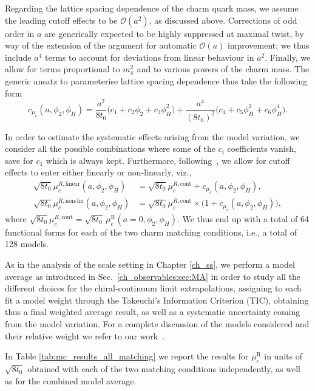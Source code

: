 Regarding the lattice spacing dependence of the charm quark mass, we assume the leading cutoff effects to 
be $\mathcal{O}(a^2)$, as discussed above. Corrections of odd order in $a$ are generically expected to be highly
suppressed at maximal twist, by way of the extension of the argument for automatic $\mathcal{O}(a)$
improvement; we thus include $a^4$ terms to account for deviations from linear behaviour
in $a^2$. Finally, we allow for terms proportional to $m_\pi^2$ and to various powers of the charm
mass. The generic ansatz to parameterise lattice spacing dependence thus take the following form
\begin{equation}
	c_{\mu_c}(a, \phi_2, \phi_H) = \frac{a^2}{8t_0} \big(
	c_1 + c_2\phi_2 + c_3 \phi_H^2
	\big)
	+
	\frac{a^4}{(8t_0)^2}\big(
	c_4 + c_5\phi_H^2 + c_6 \phi_H^4
	\big).
	\label{eq:lattice_spacing_dependence}
\end{equation} 

In order to estimate the systematic effects arising from the model variation, we consider all the possible 
combinations where some of the $c_i$ coefficients vanish, save for $c_1$ which is always kept.
Furthermore, following~\cite{Heitger:2021apz}, we allow for cutoff effects to enter either linearly or 
non-linearly, viz.,
  \begin{align} 	\label{eq:tot_model}
 	\sqrt{8t_0}\mu_c^{R,\text{linear}}(a, \phi_2,\phi_H) &=
 	\sqrt{8t_0}\mu_c^{R,\text{cont}} + c_{\mu_c}(a, \phi_2,\phi_H),
 	\\
 	\sqrt{8t_0}\mu_c^{R,\text{non-lin}}(a, \phi_2,\phi_H) &=
 	\sqrt{8t_0}\mu_c^{R,\text{cont}} \times\big(1+ c_{\mu_c}(a, \phi_2,\phi_H)\big), \nonumber
 \end{align}
where $\sqrt{8t_0}\mu_c^{R,\text{cont}}=\sqrt{8t_0}\, \mu_c^{\textrm{R}}(a=0, \phi_2, \phi_H)$. We thus end up with a total of 64 functional forms for each of the two charm matching conditions,
i.e., a total of 128 models.

As in the analysis of the scale setting in Chapter \ref{ch_ss}, we perform a model average as introduced in Sec.~\ref{ch_observables:sec:MA} in order to study all the different choices for the chiral-continuum limit extrapolations, assigning to each fit a model weight through the Takeuchi's Information Criterion (TIC), obtaining thus a final weighted average result, as well as a systematic uncertainty coming from the model variation. For a complete discussion of the models considered and their relative weight we refer to our work~\citep{charm}.

In Table \ref{tab:mc_results_all_matching} we report the results for $\mu_c^{\textrm{R}}$
in units of $\sqrt{8t_0}$ obtained with each of the two matching conditions independently,
as well as for the combined model average.  

